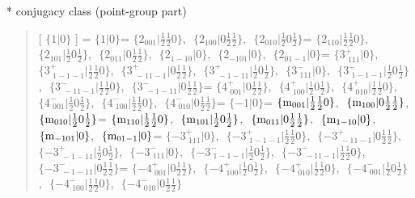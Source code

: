 \documentclass[fleqn,10pt,landscape]{jsarticle}
\begin{document}
* conjugacy class (point-group part)
\begin{quote}
[ $\{1|0\}$ ] = \quad $\{1|0\}$ = \quad $\{2{}_{001}|\frac{1}{2} \frac{1}{2} 0\}$,\,\, $\{2{}_{100}|0 \frac{1}{2} \frac{1}{2}\}$,\,\, $\{2{}_{010}|\frac{1}{2} 0 \frac{1}{2}\}$ = \quad $\{2{}_{110}|\frac{1}{2} \frac{1}{2} 0\}$,\,\, $\{2{}_{101}|\frac{1}{2} 0 \frac{1}{2}\}$,\,\, $\{2{}_{011}|0 \frac{1}{2} \frac{1}{2}\}$,\,\, $\{2{}_{1-10}|0\}$,\,\, $\{2{}_{-101}|0\}$,\,\, $\{2{}_{01-1}|0\}$\newline[ $\{3^{+}_{\,\,111}|0\}$ ] = \quad $\{3^{+}_{\,\,111}|0\}$,\,\, $\{3^{+}_{\,\,1-1-1}|\frac{1}{2} \frac{1}{2} 0\}$,\,\, $\{3^{+}_{\,\,-11-1}|0 \frac{1}{2} \frac{1}{2}\}$,\,\, $\{3^{+}_{\,\,-1-11}|\frac{1}{2} 0 \frac{1}{2}\}$,\,\, $\{3^{-}_{\,\,111}|0\}$,\,\, $\{3^{-}_{\,\,1-1-1}|\frac{1}{2} 0 \frac{1}{2}\}$,\,\, $\{3^{-}_{\,\,-11-1}|\frac{1}{2} \frac{1}{2} 0\}$,\,\, $\{3^{-}_{\,\,-1-11}|0 \frac{1}{2} \frac{1}{2}\}$ = \quad $\{4^{+}_{\,\,001}|0 \frac{1}{2} \frac{1}{2}\}$,\,\, $\{4^{+}_{\,\,100}|\frac{1}{2} 0 \frac{1}{2}\}$,\,\, $\{4^{+}_{\,\,010}|\frac{1}{2} \frac{1}{2} 0\}$,\,\, $\{4^{-}_{\,\,001}|\frac{1}{2} 0 \frac{1}{2}\}$,\,\, $\{4^{-}_{\,\,100}|\frac{1}{2} \frac{1}{2} 0\}$,\,\, $\{4^{-}_{\,\,010}|0 \frac{1}{2} \frac{1}{2}\}$\newline[ $\{-1|0\}$ ] = \quad $\{-1|0\}$ = \quad $\{{\rm m}_{001}|\frac{1}{2} \frac{1}{2} 0\}$,\,\, $\{{\rm m}_{100}|0 \frac{1}{2} \frac{1}{2}\}$,\,\, $\{{\rm m}_{010}|\frac{1}{2} 0 \frac{1}{2}\}$ = \quad $\{{\rm m}_{110}|\frac{1}{2} \frac{1}{2} 0\}$,\,\, $\{{\rm m}_{101}|\frac{1}{2} 0 \frac{1}{2}\}$,\,\, $\{{\rm m}_{011}|0 \frac{1}{2} \frac{1}{2}\}$,\,\, $\{{\rm m}_{1-10}|0\}$,\,\, $\{{\rm m}_{-101}|0\}$,\,\, $\{{\rm m}_{01-1}|0\}$\newline[ $\{-3^{+}_{\,\,111}|0\}$ ] = \quad $\{-3^{+}_{\,\,111}|0\}$,\,\, $\{-3^{+}_{\,\,1-1-1}|\frac{1}{2} \frac{1}{2} 0\}$,\,\, $\{-3^{+}_{\,\,-11-1}|0 \frac{1}{2} \frac{1}{2}\}$,\,\, $\{-3^{+}_{\,\,-1-11}|\frac{1}{2} 0 \frac{1}{2}\}$,\,\, $\{-3^{-}_{\,\,111}|0\}$,\,\, $\{-3^{-}_{\,\,1-1-1}|\frac{1}{2} 0 \frac{1}{2}\}$,\,\, $\{-3^{-}_{\,\,-11-1}|\frac{1}{2} \frac{1}{2} 0\}$,\,\, $\{-3^{-}_{\,\,-1-11}|0 \frac{1}{2} \frac{1}{2}\}$ = \quad $\{-4^{+}_{\,\,001}|0 \frac{1}{2} \frac{1}{2}\}$,\,\, $\{-4^{+}_{\,\,100}|\frac{1}{2} 0 \frac{1}{2}\}$,\,\, $\{-4^{+}_{\,\,010}|\frac{1}{2} \frac{1}{2} 0\}$,\,\, $\{-4^{-}_{\,\,001}|\frac{1}{2} 0 \frac{1}{2}\}$,\,\, $\{-4^{-}_{\,\,100}|\frac{1}{2} \frac{1}{2} 0\}$,\,\, $\{-4^{-}_{\,\,010}|0 \frac{1}{2} \frac{1}{2}\}$\newline
\end{quote}
\end{document}
